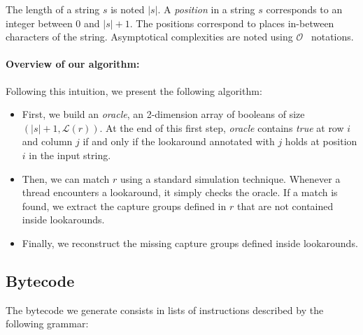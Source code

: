 \documentclass{article}
\def\size#1{\ensuremath{|#1|}}
\def\looknb#1{\ensuremath{\mathcal{L}(#1)}}
\def\bigo{\ensuremath{\mathcal{O}}}
\begin{document}
The length of a string $s$ is noted \size{s}.
A \textit{position} in a string $s$ corresponds to an integer between 0 and $\size{s}+1$.
The positions correspond to places in-between characters of the string.
Asymptotical complexities are noted using \bigo~ notations.



\paragraph{Overview of our algorithm:}

Following this intuition, we present the following algorithm:

\begin{itemize}
\item First, we build an \textit{oracle}, an 2-dimension array of booleans of size $(\size{s}+1, \looknb{r})$.
  At the end of this first step, \textit{oracle} contains \textit{true} at row $i$ and column $j$ if and only if the lookaround annotated with $j$ holds at position $i$ in the input string.
\item Then, we can match $r$ using a standard simulation technique. Whenever a thread encounters a lookaround, it simply checks the oracle. If a match is found, we extract the capture groups defined in $r$ that are not contained inside lookarounds.
\item Finally, we reconstruct the missing capture groups defined inside lookarounds.
\end{itemize}

  
\subsection{Bytecode}

The bytecode we generate consists in lists of instructions described by the following grammar:

\def\instr{\ensuremath{\mathit{e}}}
\def\lbl{\ensuremath{\mathit{l}}}
\def\reg{\ensuremath{\mathit{reg}}}
\def\lid{\ensuremath{\mathit{lid}}}
\end{document}
